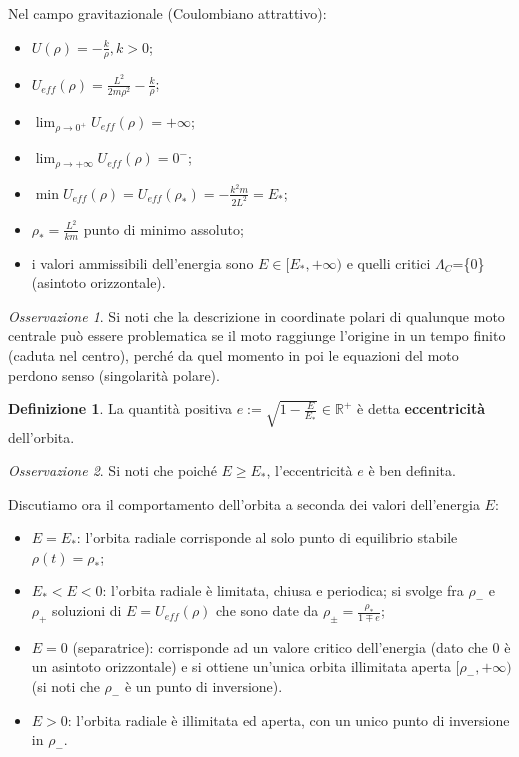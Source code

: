 \documentclass{book}
\theoremstyle{plain}
\theoremstyle{plain}
\theoremstyle{plain}
\theoremstyle{plain}
\theoremstyle{plain}
\theoremstyle{definition}
\newtheorem{defi}{Definizione}[chapter]
\theoremstyle{remark}
\newtheorem*{oss}{Osservazione}
\theoremstyle{definition}
\begin{document}
Nel campo gravitazionale (Coulombiano attrattivo):
\begin{itemize}
\everymath{\displaystyle}
    \item $U(\rho)=-\frac{k}{\rho}, k>0$;
    \item $U_{eff}(\rho)=\frac{L^2}{2m\rho^2}-\frac{k}{\rho}$;
    \item $\lim_{\rho\to0^+}U_{eff}(\rho)=+\infty$;
    \item $\lim_{\rho\to+\infty}U_{eff}(\rho)=0^-$;
    \item $\min U_{eff}(\rho)=U_{eff}(\rho_*)=-\frac{k^2m}{2L^2}=E_*$;
    \item $\rho_*=\frac{L^2}{km}$ punto di minimo assoluto;
    \item i valori ammissibili dell'energia sono $E\in[E_*,+\infty)$ e quelli critici $\Lambda_C$=\{0\} (asintoto orizzontale). 
\end{itemize}

\begin{oss}
    Si noti che la descrizione in coordinate polari di qualunque moto centrale può essere problematica se il moto raggiunge l'origine in un tempo finito (caduta nel centro), perché da quel momento in poi le equazioni del moto perdono senso (singolarità polare).
\end{oss}

\begin{defi}
\everymath{\displaystyle}
    La quantità positiva $e:=\sqrt{1-\frac{E}{E_*}} \in \mathbb{R}^+$ è detta \textbf{eccentricità} dell'orbita.
\end{defi}

\begin{oss}
    Si noti che poiché $E\geq E_*$, l'eccentricità $e$ è ben definita.
\end{oss}

\noindent Discutiamo ora il comportamento dell'orbita a seconda dei valori dell'energia $E$:
\begin{itemize}
\everymath{\displaystyle}
    \item $E=E_*$: l'orbita radiale corrisponde al solo punto di equilibrio stabile $\rho(t)=\rho_*$;
    \item $E_*<E<0$: l'orbita radiale è limitata, chiusa e periodica; si svolge fra $\rho_-$ e $\rho_+$ soluzioni di $E=U_{eff}(\rho)$ che sono date da $\rho_{\pm}=\frac{\rho_*}{1\mp e}$;
    \item $E=0$ (separatrice): corrisponde ad un valore critico dell'energia (dato che $0$ è un asintoto orizzontale) e si ottiene un'unica orbita illimitata aperta $[\rho_-, +\infty)$ (si noti che $\rho_-$ è un punto di inversione).
    \item $E>0$: l'orbita radiale è illimitata ed aperta, con un unico punto di inversione in $\rho_-$.
\end{itemize}
\end{document}
